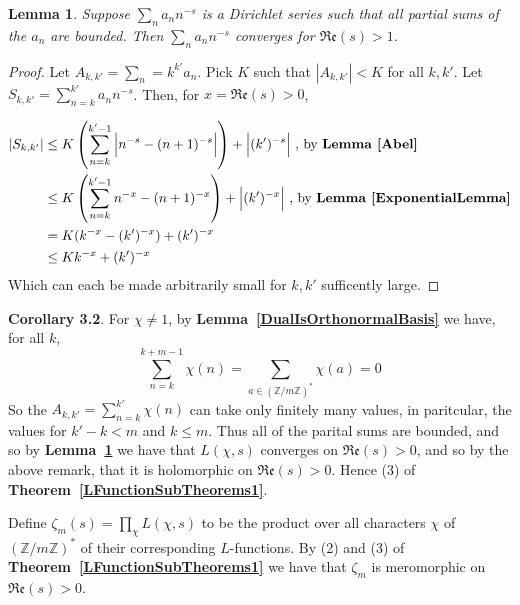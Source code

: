 \documentclass[12pt]{article}
\newcommand{\ints}{\mathbb{Z}}
\newcommand{\intsmod}[1]{\ints / #1 \ints}
\newcommand{\lref}[1]{\textbf{Lemma~\ref{#1}}}
\newcommand{\tref}[1]{\textbf{Theorem~\ref{#1}}}
\newtheorem{lemma}{Lemma}
\numberwithin{equation}{section}
\numberwithin{thm}{section}
\numberwithin{lemma}{section}
\numberwithin{cor}{section}
\begin{document}
\begin{lemma}\label{DirichletTest}
  Suppose $\sum_n a_n n^{-s}$ is a Dirichlet series such that all partial sums of the $a_n$ are bounded. Then $\sum_n a_n n^{-s}$ converges for $\mathfrak{Re}(s) > 1$.
\end{lemma}
\begin{proof}
  Let $A_{k,k'} = \sum_n=k^{k'} a_n$. Pick $K$ such that $|A_{k, k'}| < K$ for all $k, k'$. Let $S_{k, k'} = \sum_{n = k}^{k'} a_n n^{-s}$. Then, for $x = \mathfrak{Re}(s) > 0$, 
  
  \begin{align*}
    |S_{k, k'}| &\leq K \left( \sum_{n = k}^{k'-1} \Big| n^{-s} - (n + 1)^{-s} \Big| \right) + \Big| (k')^{-s} \Big| \text{ , by } \lref{Abel} \\
    &\leq K \left( \sum_{n=k}^{k'-1} n^{-x} - (n+1)^{-x} \right) + \Big| (k')^{-x} \Big| \text{ , by } \lref{ExponentialLemma} \\
    &= K (k^{-x} - (k')^{-x}) + (k')^{-x} \\
    &\leq Kk^{-x} + (k')^{-x}
  \end{align*} Which can each be made arbitrarily small for $k, k'$ sufficently large.
\end{proof}

\textbf{Corollary 3.2}. For $\chi \ne 1$, by \lref{DualIsOrthonormalBasis} we have, for all $k$, \begin{equation*}
  \sum_{n = k}^{k + m - 1} \chi(n) = \sum_{a \in (\intsmod{m})^*} \chi(a) = 0
\end{equation*} So the $A_{k, k'} = \sum_{n=k}^{k'} \chi(n)$ can take only finitely many values, in paritcular, the values for $k' - k < m$ and $k \leq m$. Thus all of the parital sums are bounded, and so by \lref{DirichletTest} we have that $L(\chi, s)$ converges on $\mathfrak{Re}(s) > 0$, and so by the above remark, that it is holomorphic on $\mathfrak{Re}(s) > 0$. Hence (3) of \tref{LFunctionSubTheorems1}.

Define $\zeta_m(s) = \prod_{\chi} L(\chi, s)$ to be the product over all characters $\chi$ of $(\intsmod{m})^*$ of their corresponding $L$-functions. By (2) and (3) of \tref{LFunctionSubTheorems1} we have that $\zeta_m$ is meromorphic on $\mathfrak{Re}(s) > 0$. 
\end{document}
